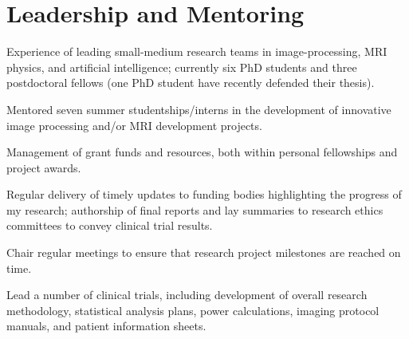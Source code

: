 \documentclass[]{mbcv}
\begin{document}
\section{Leadership and Mentoring}
\vspace*{10pt}
\begin{tightemize}
\item Experience of leading small-medium research teams in image-processing, MRI physics, and artificial intelligence; currently six PhD students and three postdoctoral fellows (one PhD student have recently defended their thesis).
\item Mentored seven summer studentships/interns in the development of innovative image processing and/or MRI development projects.
\item Management of grant funds and resources, both within personal fellowships and project awards.
\item Regular delivery of timely updates to funding bodies highlighting the progress of my research; authorship of final reports and lay summaries to research ethics committees to convey clinical trial results. 
\item Chair regular meetings to ensure that research project milestones are reached on time.
\item Lead a number of clinical trials, including development of overall research methodology, statistical analysis plans, power calculations, imaging protocol manuals, and patient information sheets. 

\end{tightemize}
\sectionsep
\end{document}
